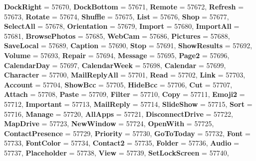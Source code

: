 \begin{DoxyCompactItemize}
{\bfseries Dock\+Right} = 57670, 
{\bfseries Dock\+Bottom} = 57671, 
{\bfseries Remote} = 57672, 
{\bfseries Refresh} = 57673, 
\newline
{\bfseries Rotate} = 57674, 
{\bfseries Shuffle} = 57675, 
{\bfseries List} = 57676, 
{\bfseries Shop} = 57677, 
\newline
{\bfseries Select\+All} = 57678, 
{\bfseries Orientation} = 57679, 
{\bfseries Import} = 57680, 
{\bfseries Import\+All} = 57681, 
\newline
{\bfseries Browse\+Photos} = 57685, 
{\bfseries Web\+Cam} = 57686, 
{\bfseries Pictures} = 57688, 
{\bfseries Save\+Local} = 57689, 
\newline
{\bfseries Caption} = 57690, 
{\bfseries Stop} = 57691, 
{\bfseries Show\+Results} = 57692, 
{\bfseries Volume} = 57693, 
\newline
{\bfseries Repair} = 57694, 
{\bfseries Message} = 57695, 
{\bfseries Page2} = 57696, 
{\bfseries Calendar\+Day} = 57697, 
\newline
{\bfseries Calendar\+Week} = 57698, 
{\bfseries Calendar} = 57699, 
{\bfseries Character} = 57700, 
{\bfseries Mail\+Reply\+All} = 57701, 
\newline
{\bfseries Read} = 57702, 
{\bfseries Link} = 57703, 
{\bfseries Account} = 57704, 
{\bfseries Show\+Bcc} = 57705, 
\newline
{\bfseries Hide\+Bcc} = 57706, 
{\bfseries Cut} = 57707, 
{\bfseries Attach} = 57708, 
{\bfseries Paste} = 57709, 
\newline
{\bfseries Filter} = 57710, 
{\bfseries Copy} = 57711, 
{\bfseries Emoji2} = 57712, 
{\bfseries Important} = 57713, 
\newline
{\bfseries Mail\+Reply} = 57714, 
{\bfseries Slide\+Show} = 57715, 
{\bfseries Sort} = 57716, 
{\bfseries Manage} = 57720, 
\newline
{\bfseries All\+Apps} = 57721, 
{\bfseries Disconnect\+Drive} = 57722, 
{\bfseries Map\+Drive} = 57723, 
{\bfseries New\+Window} = 57724, 
\newline
{\bfseries Open\+With} = 57725, 
{\bfseries Contact\+Presence} = 57729, 
{\bfseries Priority} = 57730, 
{\bfseries Go\+To\+Today} = 57732, 
\newline
{\bfseries Font} = 57733, 
{\bfseries Font\+Color} = 57734, 
{\bfseries Contact2} = 57735, 
{\bfseries Folder} = 57736, 
\newline
{\bfseries Audio} = 57737, 
{\bfseries Placeholder} = 57738, 
{\bfseries View} = 57739, 
{\bfseries Set\+Lock\+Screen} = 57740, 
\newline

\end{DoxyCompactItemize}
